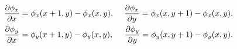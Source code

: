 \documentclass[lettersize,journal]{IEEEtran}
\begin{document}
\begin{equation} \label{eq:finite_differences}
    \begin{aligned}
        & \frac{\partial \phi_x}{\partial x} = \phi_x(x + 1, y) - \phi_x(x, y), \hspace{0.05in}
        & \frac{\partial \phi_x}{\partial y} = \phi_x(x, y + 1) - \phi_x(x, y), \\
        & \frac{\partial \phi_y}{\partial x} = \phi_y(x + 1, y) - \phi_y(x, y), \hspace{0.05in}
        & \frac{\partial \phi_y}{\partial y} = \phi_y(x, y + 1) - \phi_y(x, y). \\
    \end{aligned}
\end{equation}


\end{document}
